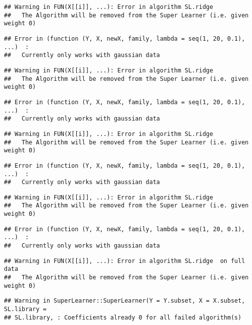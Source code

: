 \documentclass[
]{article}
\begin{document}
\begin{verbatim}
## Warning in FUN(X[[i]], ...): Error in algorithm SL.ridge 
##   The Algorithm will be removed from the Super Learner (i.e. given weight 0)
\end{verbatim}

\begin{verbatim}
## Error in (function (Y, X, newX, family, lambda = seq(1, 20, 0.1), ...)  : 
##   Currently only works with gaussian data
\end{verbatim}

\begin{verbatim}
## Warning in FUN(X[[i]], ...): Error in algorithm SL.ridge 
##   The Algorithm will be removed from the Super Learner (i.e. given weight 0)
\end{verbatim}

\begin{verbatim}
## Error in (function (Y, X, newX, family, lambda = seq(1, 20, 0.1), ...)  : 
##   Currently only works with gaussian data
\end{verbatim}

\begin{verbatim}
## Warning in FUN(X[[i]], ...): Error in algorithm SL.ridge 
##   The Algorithm will be removed from the Super Learner (i.e. given weight 0)
\end{verbatim}

\begin{verbatim}
## Error in (function (Y, X, newX, family, lambda = seq(1, 20, 0.1), ...)  : 
##   Currently only works with gaussian data
\end{verbatim}

\begin{verbatim}
## Warning in FUN(X[[i]], ...): Error in algorithm SL.ridge 
##   The Algorithm will be removed from the Super Learner (i.e. given weight 0)
\end{verbatim}

\begin{verbatim}
## Error in (function (Y, X, newX, family, lambda = seq(1, 20, 0.1), ...)  : 
##   Currently only works with gaussian data
\end{verbatim}

\begin{verbatim}
## Warning in FUN(X[[i]], ...): Error in algorithm SL.ridge  on full data 
##   The Algorithm will be removed from the Super Learner (i.e. given weight 0)
\end{verbatim}

\begin{verbatim}
## Warning in SuperLearner::SuperLearner(Y = Y.subset, X = X.subset, SL.library =
## SL.library, : Coefficients already 0 for all failed algorithm(s)
\end{verbatim}
\end{document}

